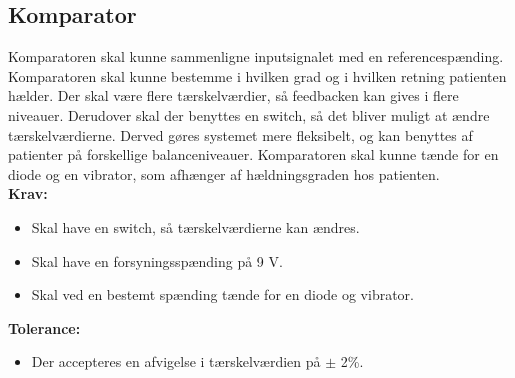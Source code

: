 \subsection{Komparator} 
Komparatoren skal kunne sammenligne inputsignalet med en referencespænding. Komparatoren skal kunne bestemme i hvilken grad og i hvilken retning patienten hælder. Der skal være flere tærskelværdier, så feedbacken kan gives i flere niveauer. Derudover skal der benyttes en switch, så det bliver muligt at ændre tærskelværdierne. Derved gøres systemet mere fleksibelt, og kan benyttes af patienter på forskellige balanceniveauer. Komparatoren skal kunne tænde for en diode og en vibrator, som afhænger af hældningsgraden hos patienten. \\
\textbf{Krav:}
\begin{itemize}
\item Skal have en switch, så tærskelværdierne kan ændres.
\item Skal have en forsyningsspænding på 9 V.
\item Skal ved en bestemt spænding  tænde for en diode  og vibrator.
\end{itemize}
\textbf{Tolerance:}
\begin{itemize}
\item Der accepteres en afvigelse i tærskelværdien på $\pm$ 2\%.
\end{itemize}

